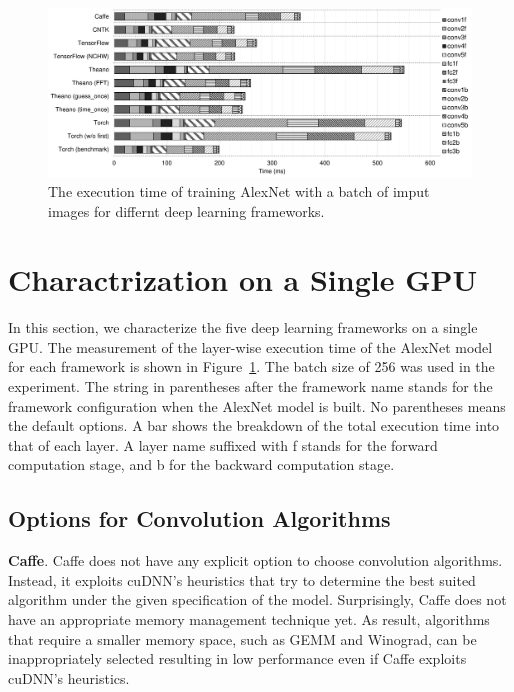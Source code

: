 \begin{figure}[htbp]
  \centering
  \includegraphics[width=\linewidth]{./figures/time_frameworks}
  \caption{%
The execution time of training AlexNet with a batch of imput images for differnt deep learning frameworks. 
\label{fig_time_frameworks}
  }
\end{figure}


\section{Charactrization on a Single GPU}
\label{sec:singlGPU}
In this section, we characterize the five deep learning frameworks on a single GPU. The measurement of the layer-wise execution time of the AlexNet model for each framework is shown in Figure~\ref{fig_time_frameworks}. The batch size of 256 was used in the experiment. The string in parentheses after the framework name stands for the framework configuration when the AlexNet model is built. No parentheses means the default options. A bar shows the breakdown of the total execution time into that of each layer. A layer name suffixed with \textsf{f} stands for the forward computation stage, and \textsf{b} for the backward computation stage.

\subsection{Options for Convolution Algorithms}
{\bf Caffe}. Caffe does not have any explicit option to choose convolution algorithms. Instead, it exploits cuDNN's heuristics that try to determine the best suited algorithm under the given specification of the model. Surprisingly, Caffe does not have an appropriate memory management technique yet. As result, algorithms that require a smaller memory space, such as GEMM and Winograd, can be inappropriately selected resulting in low performance even if Caffe exploits cuDNN's heuristics. 


